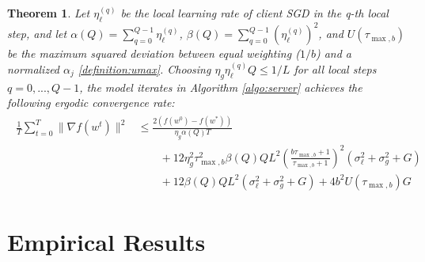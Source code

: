 \documentclass{article}
\newtheorem{theorem}{Theorem} %
\begin{document}
\begin{theorem}
    \label{theorem:convergence}
    Let $\eta_{\ell}^{(q)}$ be the local learning rate of client SGD in the q-th local step, and let $\alpha(Q) = \sum_{q=0}^{Q-1}{\eta_\ell^{(q)}}$, $\beta(Q) = \sum_{q=0}^{Q-1}{(\eta_\ell^{(q)})^2}$, and $U(\tau_{\max, b})$ be the maximum squared deviation between equal weighting ($1/b$) and a normalized $\alpha_j$ \ref{definition:umax}. Choosing $\eta_g \eta_\ell^{(q)} Q \leq 1/L$ for all local steps $q= 0, ..., Q-1$, the model iterates in Algorithm \ref{algo:server} achieves the following ergodic convergence rate:
    \begin{align*}
    \begin{split}
        \frac{1}{T}\sum_{t=0}^{T}{ \| \nabla f(w^t) \|^2}
    &\leq
    \frac{2 (f(w^0) - f(w^*))}{\eta_g \alpha(Q) T}
    \\
    &\qquad + 
    12 \eta_g^2 \tau_{\max, b}^2  \beta(Q) Q  L^2 
    \left( \frac{b\tau_{\max, b} + 1}{\tau_{\max, b} + 1}\right)^2
    \left(\sigma_\ell^2 + \sigma^2_g + G \right)
    \\
    &\qquad +
    12 \beta(Q)  Q L^2 ( \sigma_\ell^2 + \sigma_g^2 + G) 
    +
    4 b^2 U(\tau_{\max, b})G
    \end{split}
    \end{align*}
\end{theorem}

\section{Empirical Results}
\end{document}
